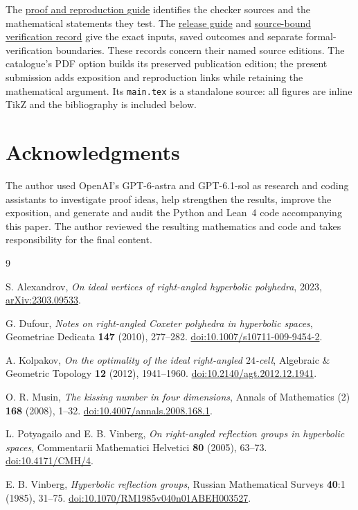\documentclass[11pt]{article}
\theoremstyle{remark}
\begin{document}
The \href{https://github.com/sashakolpakov/CoxeterPolytopes/blob/04c9bab7/docs/right_angled_sharp_dimensions_publication_proof_map_20261021.md}{proof and reproduction guide}
identifies the checker sources and the mathematical statements they
test. The \href{https://github.com/sashakolpakov/CoxeterPolytopes/blob/04c9bab7/docs/right_angled_release_packages_20261025.md}{release guide}
and \href{https://github.com/sashakolpakov/CoxeterPolytopes/blob/04c9bab7/results/right_angled_release_packages_current_20261025.json}{source-bound verification record}
give the exact inputs, saved outcomes and separate formal-verification
boundaries. These records concern their named source editions.
The catalogue's PDF option builds its preserved publication edition;
the present submission adds exposition and reproduction links while
retaining the mathematical argument. Its \texttt{main.tex} is a
standalone source: all figures are inline TikZ and the bibliography
is included below.

\section*{Acknowledgments}
The author used OpenAI's GPT-6-astra and GPT-6.1-sol as research and coding
assistants to investigate proof ideas, help strengthen the results, improve
the exposition, and generate and audit the Python and Lean~4 code
accompanying this paper. The author reviewed the resulting mathematics
and code and takes responsibility for the final content.

\begin{thebibliography}{9}
\raggedright
{}
S. Alexandrov, \emph{On ideal vertices of right-angled hyperbolic
polyhedra}, 2023, \href{https://arxiv.org/abs/2303.09533}{arXiv:2303.09533}.

G. Dufour, \emph{Notes on right-angled Coxeter polyhedra in hyperbolic
spaces}, Geometriae Dedicata \textbf{147} (2010), 277--282.
\href{https://doi.org/10.1007/s10711-009-9454-2}{doi:10.1007/s10711-009-9454-2}.

A. Kolpakov, \emph{On the optimality of the ideal right-angled
$24$-cell}, Algebraic \& Geometric Topology \textbf{12} (2012),
1941--1960.
\href{https://doi.org/10.2140/agt.2012.12.1941}{doi:10.2140/agt.2012.12.1941}.

O. R. Musin, \emph{The kissing number in four dimensions}, Annals of
Mathematics (2) \textbf{168} (2008), 1--32.
\href{https://doi.org/10.4007/annals.2008.168.1}{doi:10.4007/annals.2008.168.1}.

L. Potyagailo and E. B. Vinberg, \emph{On right-angled reflection
groups in hyperbolic spaces}, Commentarii Mathematici Helvetici
\textbf{80} (2005), 63--73.
\href{https://doi.org/10.4171/CMH/4}{doi:10.4171/CMH/4}.

E. B. Vinberg, \emph{Hyperbolic reflection groups}, Russian Mathematical
Surveys \textbf{40}:1 (1985), 31--75.
\href{https://doi.org/10.1070/RM1985v040n01ABEH003527}{doi:10.1070/RM1985v040n01ABEH003527}.
\end{thebibliography}
\end{document}
